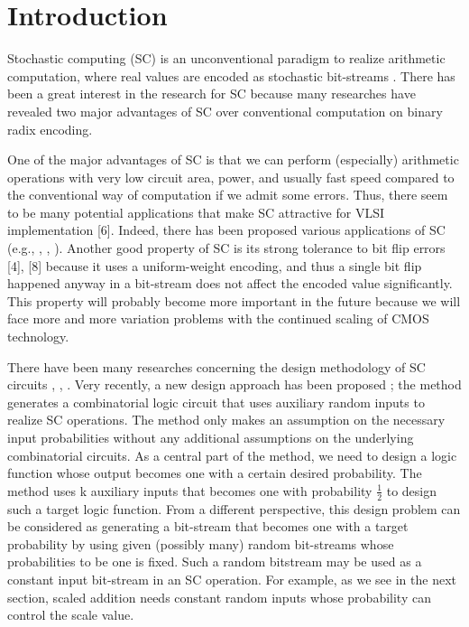 \documentclass[10pt,conference]{IEEEtran}
\begin{document}
\section{Introduction}
\label{intro}
Stochastic computing (SC) is an unconventional paradigm to
realize arithmetic computation, where real values are encoded
as stochastic bit-streams \cite{two}. There has been a great interest
in the research for SC because many researches have revealed
two major advantages of SC over conventional computation
on binary radix encoding.
\par One of the major advantages of SC is that we can perform
(especially) arithmetic operations with very low circuit area,
power, and usually fast speed compared to the conventional
way of computation if we admit some errors. Thus, there seem
to be many potential applications that make SC attractive for
VLSI implementation [6]. Indeed, there has been proposed
various applications of SC (e.g., \cite{seven}, \cite{eleven}, \cite{fourteen}). Another good
property of SC is its strong tolerance to bit flip errors [4],
[8] because it uses a uniform-weight encoding, and thus a
single bit flip happened anyway in a bit-stream does not affect
the encoded value significantly. This property will probably
become more important in the future because we will face
more and more variation problems with the continued scaling
of CMOS technology.
\par
There have been many researches concerning the design
methodology of SC circuits \cite{one}, \cite{six}, \cite{nine}. Very recently, a new
design approach has been proposed \cite{fifteen}; the method generates
a combinatorial logic circuit that uses auxiliary random inputs
to realize SC operations. The method only makes an assumption
on the necessary input probabilities without any additional
assumptions on the underlying combinatorial circuits. As a
central part of the method, we need to design a logic function
whose output becomes one with a certain desired probability.
The method uses k auxiliary inputs that becomes one with
probability $\frac{1}
{2}$ to design such a target logic function. From a
different perspective, this design problem can be considered
as generating a bit-stream that becomes one with a target
probability by using given (possibly many) random bit-streams
whose probabilities to be one is fixed. Such a random bitstream
may be used as a constant input bit-stream in an SC
operation. For example, as we see in the next section, scaled
addition needs constant random inputs whose probability can
control the scale value.
\end{document}
